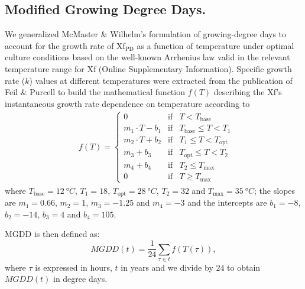     \subsection{Modified Growing Degree Days.} We generalized McMaster \&
    Wilhelm’s \cite{McMaster1997} formulation of growing-degree days to account
    for
    the growth rate of Xf$_{\textrm{PD}}$ as a function of temperature under
    optimal culture conditions based on the well-known Arrhenius law valid in
    the
    relevant temperature range for Xf (Online Supplementary Information).
    Specific growth rate
    ($k$) values at different temperatures were extracted from the publication
    of
    Feil \& Purcell \cite{Feil2001} to build the mathematical function $f(T)$
    describing the Xf’s instantaneous growth rate dependence on temperature
    according to
    \begin{align*}
         & f(T)=\left\{\begin{array}{lll}
                           0                & \textrm{if} & T<T_{\textrm{base}}
                           \\
                           m_1\cdot T-b_1   & \textrm{if} & T_{\textrm{base}}
                           \leq T < T_1
                           \\
                           m_2\cdot T + b_2 & \textrm{if} & T_{1} \leq T <
                           T_{\textrm{opt}}
                           \\
                           m_3 + b_3        & \textrm{if} & T_{\textrm{opt}}
                           \leq T < T_2
                           \\
                           m_4 + b_4        & \textrm{if} & T_2 \leq
                           T_{\textrm{max}}
                           \\
                           0                & \textrm{if} & T\geq
                           T_{\textrm{max}}
                       \end{array}\right. \,
    \end{align*}
    where $T_{\textrm{base}}=\SI{12}{\degree C}$, $T_1=18$,
$T_{\textrm{opt}}=\SI{28}{\degree C}$,	$T_2=32$ and
$T_{\textrm{max}}=\SI{35}{\degree C}$; the slopes are $m_1= 0.66$, $m_2=1$,
$m_3=-1.25$ and $m_4=-3$ and the intercepts are $b_1=-8$, $b_2=-14$, $b_3=4$
    and $b_4=105$.

    MGDD is then defined as:
    \begin{equation}\label{eq:MGDD_def}
        MGDD(t) = \frac{1}{24}\sum_{\tau \in t} f(T(\tau)),
    \end{equation}
    where $\tau$ is expressed in hours, $t$ in years and we divide by $24$ to
    obtain $MGDD(t)$ in degree days.

